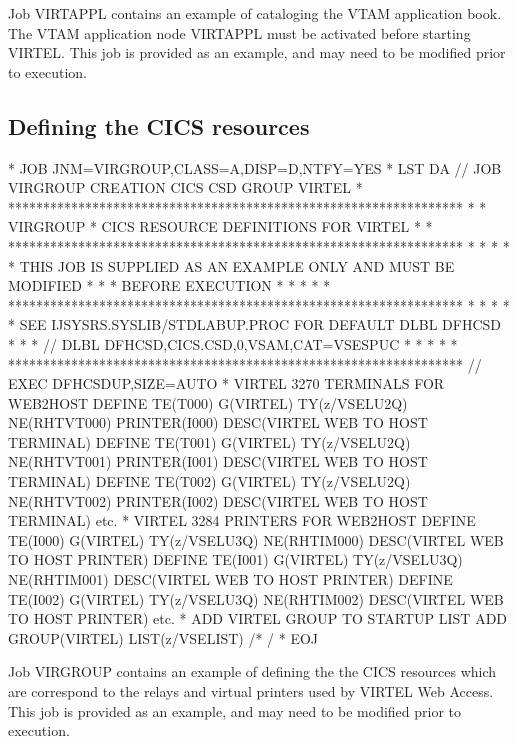 \documentclass[letterpaper,10pt,english]{sphinxmanual}
\begin{document}

Job VIRTAPPL contains an example of cataloging the VTAM application book. The VTAM application node VIRTAPPL must be activated before starting VIRTEL. This job is provided as an example, and may need to be modified prior to execution.


\subsection{Defining the CICS resources}
\label{\detokenize{Installation_Guide:defining-the-cics-resources}}
\begin{sphinxVerbatim}[commandchars=\\\{\}]
* \PYGZdl{}\PYGZdl{} JOB JNM=VIRGROUP,CLASS=A,DISP=D,NTFY=YES
* \PYGZdl{}\PYGZdl{} LST DA
// JOB VIRGROUP CREATION CICS CSD GROUP VIRTEL
* *****************************************************************
* * VIRGROUP * CICS RESOURCE DEFINITIONS FOR VIRTEL *
* *****************************************************************
* * *
* * THIS JOB IS SUPPLIED AS AN EXAMPLE ONLY AND MUST BE MODIFIED *
* * BEFORE EXECUTION *
* * *
* *****************************************************************
* * *
* * SEE IJSYSRS.SYSLIB/STDLABUP.PROC FOR DEFAULT DLBL DFHCSD *
* * // DLBL DFHCSD,\PYGZsq{}CICS.CSD\PYGZsq{},0,VSAM,CAT=VSESPUC *
* * *
* *****************************************************************
// EXEC DFHCSDUP,SIZE=AUTO
* VIRTEL 3270 TERMINALS FOR WEB2HOST
  DEFINE TE(T000) G(VIRTEL) TY(z/VSELU2Q) NE(RHTVT000) PRINTER(I000)
      DESC(VIRTEL WEB TO HOST TERMINAL)
  DEFINE TE(T001) G(VIRTEL) TY(z/VSELU2Q) NE(RHTVT001) PRINTER(I001)
      DESC(VIRTEL WEB TO HOST TERMINAL)
  DEFINE TE(T002) G(VIRTEL) TY(z/VSELU2Q) NE(RHTVT002) PRINTER(I002)
      DESC(VIRTEL WEB TO HOST TERMINAL)
      etc.
* VIRTEL 3284 PRINTERS FOR WEB2HOST
  DEFINE TE(I000) G(VIRTEL) TY(z/VSELU3Q) NE(RHTIM000)
      DESC(VIRTEL WEB TO HOST PRINTER)
  DEFINE TE(I001) G(VIRTEL) TY(z/VSELU3Q) NE(RHTIM001)
      DESC(VIRTEL WEB TO HOST PRINTER)
  DEFINE TE(I002) G(VIRTEL) TY(z/VSELU3Q) NE(RHTIM002)
      DESC(VIRTEL WEB TO HOST PRINTER)
    etc.
* ADD VIRTEL GROUP TO STARTUP LIST
  ADD GROUP(VIRTEL) LIST(z/VSELIST)
 /*
/\PYGZam{}
* \PYGZdl{}\PYGZdl{} EOJ
\end{sphinxVerbatim}


Job VIRGROUP contains an example of defining the the CICS resources which are correspond to the relays and virtual printers used by VIRTEL Web Access. This job is provided as an example, and may need to be modified prior to execution.
\end{document}
